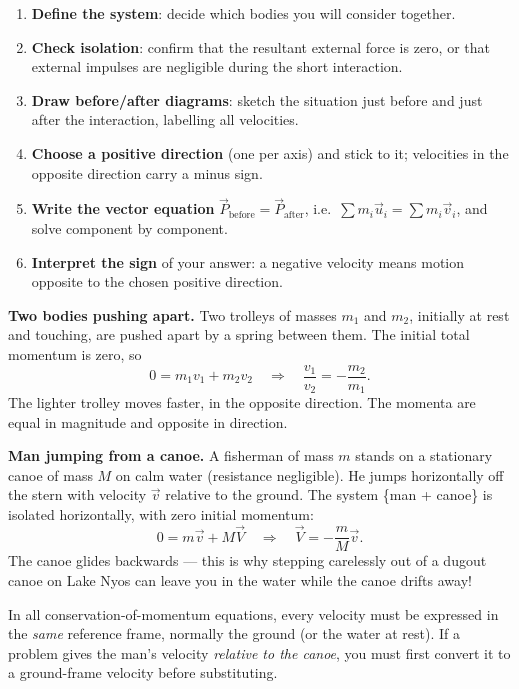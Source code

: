 \documentclass[11pt]{article}
\newcounter{popsec}
\newcounter{popsub}
\newcommand{\courssub}[1]{%
  \stepcounter{popsub}%
  \par\vspace{9pt}\noindent{\popxbold\fontsize{11.5}{13}\selectfont\color{popink}{\color{poporange}\thepopsec.\thepopsub}\hspace{6pt}#1}\par\nopagebreak\vspace{4pt}
}
\begin{document}
\begin{methode}
\begin{enumerate}
\item \textbf{Define the system}: decide which bodies you will consider together.
\item \textbf{Check isolation}: confirm that the resultant external force is zero, or that external impulses are negligible during the short interaction.
\item \textbf{Draw before/after diagrams}: sketch the situation just before and just after the interaction, labelling all velocities.
\item \textbf{Choose a positive direction} (one per axis) and stick to it; velocities in the opposite direction carry a minus sign.
\item \textbf{Write the vector equation} $\vec{P}_{\text{before}}=\vec{P}_{\text{after}}$, i.e.\ $\sum m_i\vec{u}_i=\sum m_i\vec{v}_i$, and solve component by component.
\item \textbf{Interpret the sign} of your answer: a negative velocity means motion opposite to the chosen positive direction.
\end{enumerate}
\end{methode}

\courssub{Applications in One Dimension}

\textbf{Two bodies pushing apart.} Two trolleys of masses $m_1$ and $m_2$, initially at rest and touching, are pushed apart by a spring between them. The initial total momentum is zero, so
\[
0 = m_1 v_1 + m_2 v_2 \quad\Longrightarrow\quad \frac{v_1}{v_2}=-\frac{m_2}{m_1}.
\]
The lighter trolley moves faster, in the opposite direction. The momenta are equal in magnitude and opposite in direction.

\textbf{Man jumping from a canoe.} A fisherman of mass $m$ stands on a stationary canoe of mass $M$ on calm water (resistance negligible). He jumps horizontally off the stern with velocity $\vec{v}$ relative to the ground. The system \{man + canoe\} is isolated horizontally, with zero initial momentum:
\[
0 = m\vec{v} + M\vec{V} \quad\Longrightarrow\quad \vec{V}=-\frac{m}{M}\vec{v}.
\]
The canoe glides backwards — this is why stepping carelessly out of a dugout canoe on Lake Nyos can leave you in the water while the canoe drifts away!

\begin{attention}
In all conservation-of-momentum equations, every velocity must be expressed in the \emph{same} reference frame, normally the ground (or the water at rest). If a problem gives the man's velocity \emph{relative to the canoe}, you must first convert it to a ground-frame velocity before substituting.
\end{attention}
\end{document}

